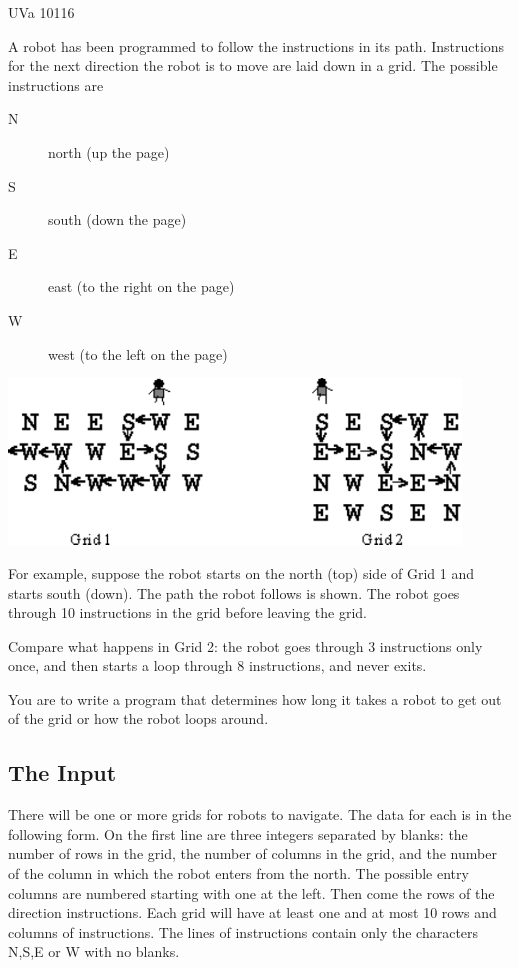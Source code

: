 
\noindent
UVa 10116\bigskip

A robot has been programmed to follow the instructions in its path.
 Instructions for the next
direction the robot is to move are laid down in a grid.  The possible
instructions are

\begin{description}
    \item[N] north (up the page)
    \item[S] south (down the page)
    \item[E] east (to the right on the page)
    \item[W] west (to the left on the page)
\end{description}

\includegraphics[width=12cm]{problems/p10116.pdf}

For example, suppose the robot starts on the north (top) side of Grid 1
and starts
south (down).  The path the robot follows is shown.  The robot goes through 
10 instructions
in the grid before leaving the grid.

Compare what happens in Grid 2:  the robot goes through 3  instructions
only once, and then
starts a loop through 8 instructions, and never exits.

You are to write a program that determines how long it takes a robot to get out of the grid or
how the robot loops around.



\subsection*{The Input}

There will be one or more grids for robots to navigate.  The data for
each is in the following form. On the first line are three integers
separated by blanks:  the number of rows in the grid, the number of
columns in the grid, and the number of the column in which the robot
enters from the north.  The possible entry columns are numbered starting
with one at the left.  Then come the rows of the direction instructions.
Each grid will have at least one and at most 10 rows and columns
of instructions.  The lines of instructions contain only the characters
N,S,E or W
with no blanks.


